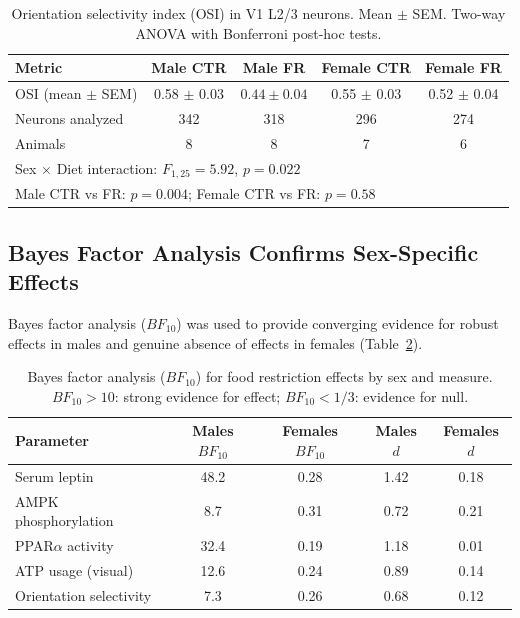 \documentclass[11pt]{article}
\begin{document}
\begin{table}[H]
\centering
\caption{Orientation selectivity index (OSI) in V1 L2/3 neurons. Mean $\pm$ SEM. Two-way ANOVA with Bonferroni post-hoc tests.}
\label{tab:orientation}
\begin{tabular}{lcccc}
\toprule
Metric & Male CTR & Male FR & Female CTR & Female FR \\
\midrule
OSI (mean $\pm$ SEM) & 0.58 $\pm$ 0.03 & $\mathbf{0.44 \pm 0.04}$ & 0.55 $\pm$ 0.03 & 0.52 $\pm$ 0.04 \\
Neurons analyzed & 342 & 318 & 296 & 274 \\
Animals & 8 & 8 & 7 & 6 \\
\midrule
\multicolumn{5}{l}{Sex $\times$ Diet interaction: $F_{1,25} = 5.92$, $p = 0.022$} \\
\multicolumn{5}{l}{Male CTR vs FR: $p = 0.004$; Female CTR vs FR: $p = 0.58$} \\
\bottomrule
\end{tabular}
\end{table}

\subsection{Bayes Factor Analysis Confirms Sex-Specific Effects}

Bayes factor analysis ($BF_{10}$) was used to provide converging evidence for robust effects in males and genuine absence of effects in females (Table~\ref{tab:bayes}).

\begin{table}[H]
\centering
\caption{Bayes factor analysis ($BF_{10}$) for food restriction effects by sex and measure. $BF_{10} > 10$: strong evidence for effect; $BF_{10} < 1/3$: evidence for null.}
\label{tab:bayes}
\begin{tabular}{lcccc}
\toprule
Parameter & Males $BF_{10}$ & Females $BF_{10}$ & Males $d$ & Females $d$ \\
\midrule
Serum leptin & 48.2 & 0.28 & 1.42 & 0.18 \\
AMPK phosphorylation & 8.7 & 0.31 & 0.72 & 0.21 \\
PPAR$\alpha$ activity & 32.4 & 0.19 & 1.18 & 0.01 \\
ATP usage (visual) & 12.6 & 0.24 & 0.89 & 0.14 \\
Orientation selectivity & 7.3 & 0.26 & 0.68 & 0.12 \\
\bottomrule
\end{tabular}
\end{table}
\end{document}
